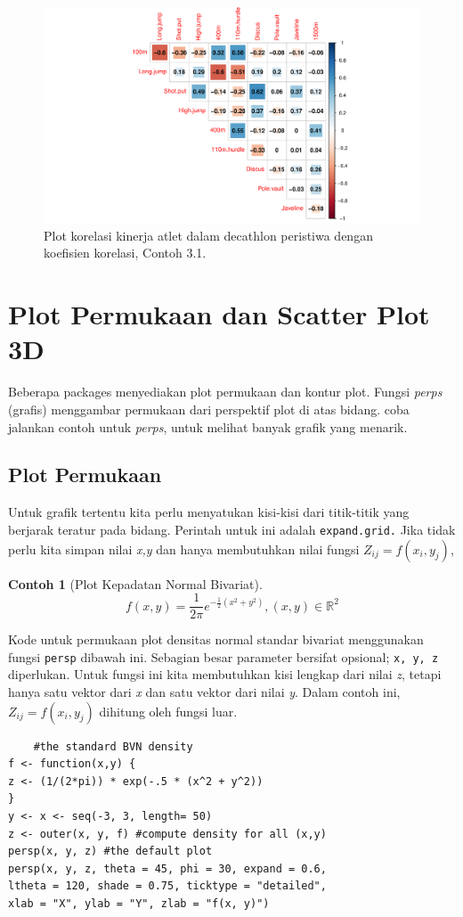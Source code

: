 \documentclass[a4paper,12pt]{article}
\theoremstyle{definition}
\newtheorem{example}{Contoh}[section]
\begin{document}
\begin{figure}[h]
    \centering
    \includegraphics[width=16cm]{gb/K2G8-Scatterplot.pdf}
    \caption{Plot korelasi kinerja atlet dalam decathlon
peristiwa dengan koefisien korelasi, Contoh 3.1.}
    \label{fig:mesh1}
\end{figure}

\section{Plot Permukaan dan Scatter Plot 3D}
Beberapa packages menyediakan plot permukaan dan kontur plot. Fungsi \textit{perps}
(grafis) menggambar permukaan dari perspektif plot di atas bidang. coba jalankan contoh untuk \textit{perps}, untuk melihat banyak grafik yang menarik. 

\subsection{Plot Permukaan}
Untuk grafik tertentu kita perlu menyatukan kisi-kisi dari titik-titik yang berjarak teratur pada bidang. Perintah untuk ini adalah \texttt{expand.grid.} Jika tidak perlu kita simpan nilai \textit{x,y} dan hanya membutuhkan nilai fungsi $Z_{ij} = f(x_i, y_j)$,

\begin{example}[Plot Kepadatan Normal Bivariat]
\begin{equation}
    f(x,y)= \frac{1}{2\pi }e^{-{\tfrac{1}{2}}(x^{2}+y^{2})},  (x,y)\in \mathbb{R}^{2}
\end{equation}

Kode untuk permukaan plot densitas normal standar bivariat menggunakan fungsi \texttt{persp} dibawah ini. Sebagian besar parameter bersifat opsional; \texttt{x, y, z} diperlukan.
Untuk fungsi ini kita membutuhkan kisi lengkap dari nilai \textit{z}, tetapi hanya satu vektor
dari \textit{x} dan satu vektor dari nilai \textit{y}. Dalam contoh ini, $Z_{ij} = f(x_i, y_j)$ 
dihitung oleh fungsi luar.

\begin{lstlisting}
    #the standard BVN density
f <- function(x,y) {
z <- (1/(2*pi)) * exp(-.5 * (x^2 + y^2))
}
y <- x <- seq(-3, 3, length= 50)
z <- outer(x, y, f) #compute density for all (x,y)
persp(x, y, z) #the default plot
persp(x, y, z, theta = 45, phi = 30, expand = 0.6,
ltheta = 120, shade = 0.75, ticktype = "detailed",
xlab = "X", ylab = "Y", zlab = "f(x, y)")
\end{lstlisting}
\end{example}
\end{document}
